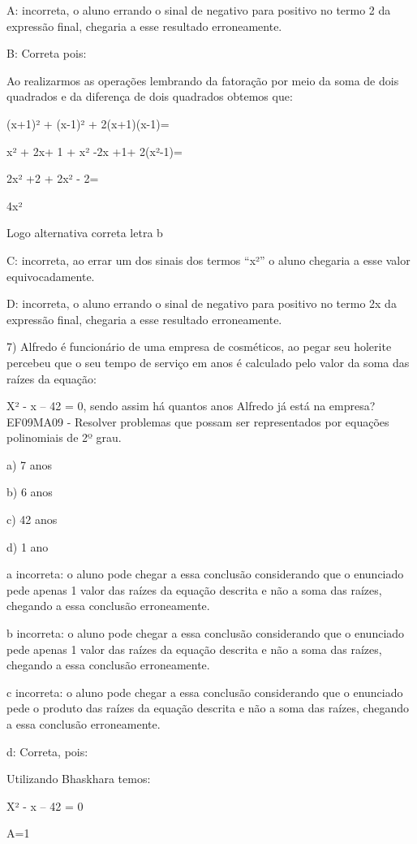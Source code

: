 A: incorreta, o aluno errando o sinal de negativo para positivo no termo
2 da expressão final, chegaria a esse resultado erroneamente.

B: Correta pois:

Ao realizarmos as operações lembrando da fatoração por meio da soma de
dois quadrados e da diferença de dois quadrados obtemos que:

(x+1)² + (x-1)² + 2(x+1)(x-1)=

x² + 2x+ 1 + x² -2x +1+ 2(x²-1)=

2x² +2 + 2x² - 2=

4x²

Logo alternativa correta letra b

C: incorreta, ao errar um dos sinais dos termos ``x²'' o aluno chegaria
a esse valor equivocadamente.

D: incorreta, o aluno errando o sinal de negativo para positivo no termo
2x da expressão final, chegaria a esse resultado erroneamente.

7) Alfredo é funcionário de uma empresa de cosméticos, ao pegar seu
holerite percebeu que o seu tempo de serviço em anos é calculado pelo
valor da soma das raízes da equação:

X² - x -- 42 = 0, sendo assim há quantos anos Alfredo já está na
empresa? EF09MA09 - Resolver problemas que possam ser representados por
equações polinomiais de 2º grau.

a) 7 anos

b) 6 anos

c) 42 anos

d) 1 ano

a incorreta: o aluno pode chegar a essa conclusão considerando que o
enunciado pede apenas 1 valor das raízes da equação descrita e não a
soma das raízes, chegando a essa conclusão erroneamente.

b incorreta: o aluno pode chegar a essa conclusão considerando que o
enunciado pede apenas 1 valor das raízes da equação descrita e não a
soma das raízes, chegando a essa conclusão erroneamente.

c incorreta: o aluno pode chegar a essa conclusão considerando que o
enunciado pede o produto das raízes da equação descrita e não a soma das
raízes, chegando a essa conclusão erroneamente.

d: Correta, pois:

Utilizando Bhaskhara temos:

X² - x -- 42 = 0

A=1

